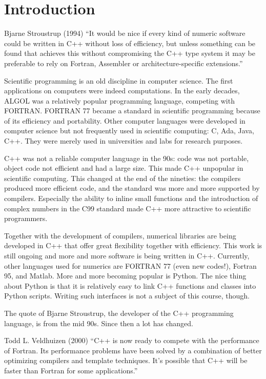 \chapter{Introduction}
\begin{zitat}{Bjarne Stroustrup (1994) \cite{stroustrup1994design}}
  ``It would be nice if every kind of numeric software could be written in C++ without loss of efficiency, but unless something can be found that achieves this without compromising the C++ type system it may be preferable to rely on Fortran, Assembler or architecture-specific extensions.''
\end{zitat}

Scientific programming is an old discipline in computer science. The first applications on computers were indeed computations.
In the early decades, ALGOL was a relatively popular programming language, competing with FORTRAN. FORTRAN 77 became a standard
in scientific programming because of its efficiency and portability. Other computer languages were developed in computer science
but not frequently used in scientific computing: C, Ada, Java, C++. They were merely used in universities and labs for research
purposes.

C++ was not a reliable computer language in the 90s: code was not portable, object code not efficient and had a large size. This
made C++ unpopular in scientific computing. This changed at the end of the nineties: the compilers produced more efficient code,
and the standard was more and more supported by compilers. Especially the ability to inline small functions and the introduction
of complex numbers in the C99 standard made C++ more attractive to scientific programmers.

Together with the development of compilers, numerical libraries are being developed in C++ that offer great flexibility together
with efficiency. This work is still ongoing and more and more software is being written in C++. Currently, other languages used
for numerics are FORTRAN 77 (even new codes!), Fortran 95, and Matlab. More and more becoming popular is Python. The nice thing
about Python is that it is relatively easy to link C++ functions and classes into Python scripts. Writing such interfaces is not
a subject of this course, though.

The quote of Bjarne Stroustrup, the developer of the C++ programming language, is from the mid 90s. Since then a lot has changed.
\begin{zitat}{Todd L. Veldhuizen (2000) \cite{veldhuizen2000}}
  ``C++ is now ready to compete with the performance of Fortran. Its performance problems have been solved by a combination of
  better optimizing compilers and template techniques. It's possible that C++ will be faster than Fortran for some applications.''
\end{zitat}

